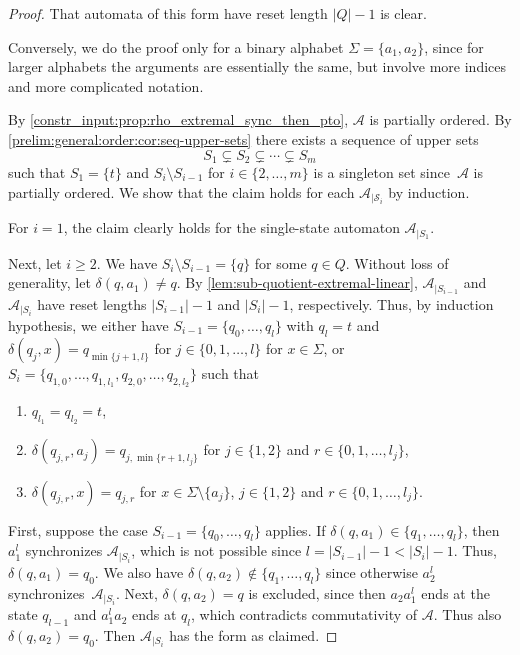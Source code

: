 \begin{proof}
That automata of this form have reset length $|Q| - 1$ is clear.	
	
Conversely, we do the proof only for a binary alphabet $\Sigma = \{a_1,a_2\}$, since for larger alphabets
the arguments are essentially the same, but involve more indices and more complicated notation.

By \cref{constr_input:prop:rho_extremal_sync_then_pto}, $\mathcal A$ is partially ordered.
By \cref{prelim:general:order:cor:seq-upper-sets} there exists a sequence of upper sets
\[
S_1 \subsetneq S_2 \subsetneq \cdots \subsetneq S_m
\]
such that $S_1 = \{t\}$ and $S_i \setminus S_{i-1}$ for $i \in \{2,\ldots,m\}$ is a singleton set since~$\mathcal A$ is partially ordered. We show that the claim 
holds for each $\mathcal A_{|\mathcal S_i}$ by induction.

For $i = 1$, the claim clearly holds for the single-state automaton $\mathcal A_{|S_1}$.

Next, let $i \ge 2$. We have $S_i \setminus S_{i-1} = \{q\}$ for some $q \in Q$.
Without loss of generality, let $\delta(q, a_1) \ne q$.
By \cref{lem:sub-quotient-extremal-linear}, $\mathcal A_{|S_{i-1}}$
and $\mathcal A_{|S_i}$ have reset lengths $|S_{i-1}| - 1$ and $|S_i|-1$, respectively.
Thus, by induction hypothesis,
we either have $S_{i-1} = \{ q_0, \ldots, q_{l} \}$
with $q_l = t$ and $\delta(q_j, x) = q_{\min\{j+1,l\}}$ for $j \in \{0,1,\ldots,l\}$
for $x \in \Sigma$,
or $S_i = \{ q_{1, 0}, \ldots, q_{1, l_1}, q_{2, 0}, \ldots, q_{2, l_2}\}$
such that
\begin{enumerate}
\item $q_{l_1} = q_{l_2} = t$,

\item $\delta(q_{j,r}, a_j) = q_{j, \min\{r+1, l_j\}}$ for $j \in \{1,2\}$ and $r \in \{0,1,\ldots,l_j\}$,

\item $\delta(q_{j,r}, x) = q_{j,r}$ for $x \in \Sigma \setminus \{a_j\}$, $j \in \{1,2\}$ and $r \in \{0,1,\ldots,l_j\}$.
\end{enumerate}

First, suppose the case $S_{i-1} = \{ q_0, \ldots, q_{l} \}$ applies.
If $\delta(q, a_1) \in \{q_1, \ldots, q_l\}$, then $a_1^{l}$ synchronizes $\mathcal A_{|S_i}$,
which is not possible since $l = |S_{i-1}| - 1 < |S_i| - 1$.
Thus, $\delta(q, a_1) = q_0$. We also have $\delta(q, a_2) \notin \{q_1, \ldots, q_l\}$
since otherwise $a_2^l$ synchronizes~$\mathcal A_{|S_i}$.
Next, $\delta(q, a_2) = q$ is excluded, since then $a_2 a_1^{l}$ ends at the state $q_{l-1}$
and $a_1^la_2$ ends at $q_l$, which contradicts commutativity of $\mathcal A$.
Thus also $\delta(q, a_2) = q_0$. Then $\mathcal A_{|S_i}$ has the form as claimed.


\end{proof}
